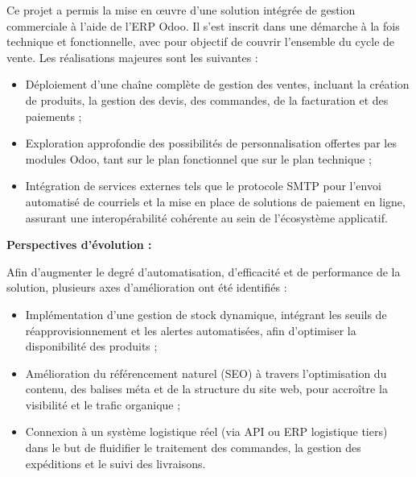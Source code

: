 \documentclass[12pt]{report}
\begin{document}
Ce projet a permis la mise en œuvre d’une solution intégrée de gestion commerciale à l’aide de l’ERP Odoo. Il s’est inscrit dans une démarche à la fois technique et fonctionnelle, avec pour objectif de couvrir l’ensemble du cycle de vente. Les réalisations majeures sont les suivantes :

\begin{itemize}
\item Déploiement d'une chaîne complète de gestion des ventes, incluant la création de produits, la gestion des devis, des commandes, de la facturation et des paiements ;
\item Exploration approfondie des possibilités de personnalisation offertes par les modules Odoo, tant sur le plan fonctionnel que sur le plan technique ;
\item Intégration de services externes tels que le protocole SMTP pour l’envoi automatisé de courriels et la mise en place de solutions de paiement en ligne, assurant une interopérabilité cohérente au sein de l’écosystème applicatif.
\end{itemize}

\bigskip

\textbf{Perspectives d’évolution :}

Afin d’augmenter le degré d’automatisation, d’efficacité et de performance de la solution, plusieurs axes d'amélioration ont été identifiés :

\begin{itemize}
\item Implémentation d’une gestion de stock dynamique, intégrant les seuils de réapprovisionnement et les alertes automatisées, afin d’optimiser la disponibilité des produits ;
\item Amélioration du référencement naturel (SEO) à travers l’optimisation du contenu, des balises méta et de la structure du site web, pour accroître la visibilité et le trafic organique ;
\item Connexion à un système logistique réel (via API ou ERP logistique tiers) dans le but de fluidifier le traitement des commandes, la gestion des expéditions et le suivi des livraisons.
\end{itemize}
\end{document}
